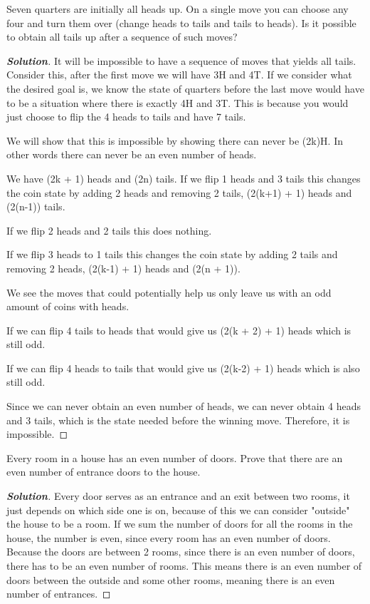 \documentclass[11pt]{article}
\newenvironment{problem}[2][Problem\!]{\begin{trivlist}
\item[\hskip \labelsep {\bfseries #1}\hskip \labelsep {\bfseries #2}]}{\end{trivlist}}
\newenvironment{solution}{\begin{proof}[\textbf{\textit{Solution}}] }{\end{proof}}
\begin{document}
\begin{tcolorbox}
    \begin{problem}{10/11 IC (46.)} Seven quarters are initially all heads up. On a single move you can choose any four and turn them over (change heads to tails and tails to heads). Is it possible to obtain all tails up after a sequence of such moves?
    \end{problem}
\end{tcolorbox}
\begin{solution}
    It will be impossible to have a sequence of moves that yields all tails. Consider this, after the first move we will have 3H and 4T. If we consider what the desired goal is, we know the state of quarters before the last move would have to be a situation where there is exactly 4H and 3T. This is because you would just choose to flip the 4 heads to tails and have 7 tails.
    
    We will show that this is impossible by showing there can never be (2k)H. In other words there can never be an even number of heads. 

    We have (2k + 1) heads and (2n) tails. If we flip 1 heads and 3 tails this changes the coin state by adding 2 heads and removing 2 tails, (2(k+1) + 1) heads and (2(n-1)) tails.

    If we flip 2 heads and 2 tails this does nothing.

    If we flip 3 heads to 1 tails this changes the coin state by adding 2 tails and removing 2 heads, (2(k-1) + 1) heads and (2(n + 1)). 

    We see the moves that could potentially help us only leave us with an odd amount of coins with heads. 

    If we can flip 4 tails to heads that would give us (2(k + 2) + 1) heads which is still odd.

    If we can flip 4 heads to tails that would give us (2(k-2) + 1) heads which is also still odd.

    Since we can never obtain an even number of heads, we can never obtain 4 heads and 3 tails, which is the state needed before the winning move. Therefore, it is impossible. 
\end{solution}

\begin{tcolorbox}
    \begin{problem}{10/13 IC (50.)} 
        Every room in a house has an even number of doors. Prove that there are an even number of entrance doors to the house. 
    \end{problem}
\end{tcolorbox}
\begin{solution}
    Every door serves as an entrance and an exit between two rooms, it just depends on which side one is on, because of this we can consider "outside" the house to be a room. If we sum the number of doors for all the rooms in the house, the number is even, since every room has an even number of doors. Because the doors are between 2 rooms, since there is an even number of doors, there has to be an even number of rooms. This means there is an even number of doors between the outside and some other rooms, meaning there is an even number of entrances. 
\end{solution}
\end{document}
